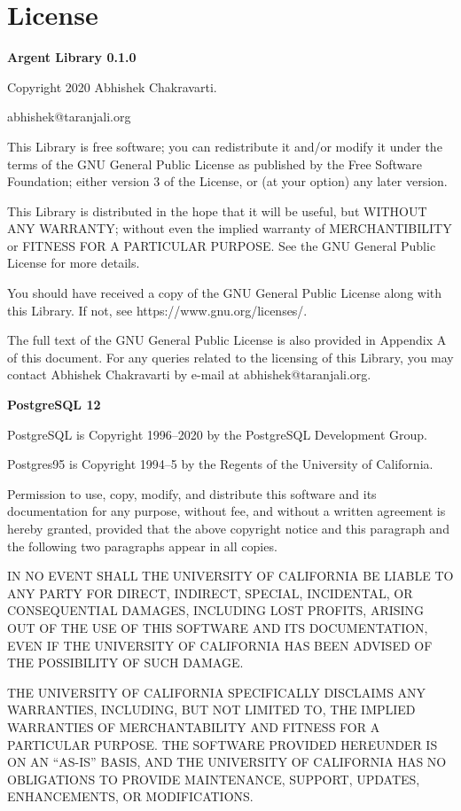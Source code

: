 \chapter{License}

\begin{center}
\textbf{Argent Library 0.1.0} \par
Copyright \small{\textcopyright} 2020 Abhishek Chakravarti.\par
abhishek@taranjali.org
\end{center}

This Library is free software; you can redistribute it and/or modify it under 
the terms of the GNU General Public License as published by the Free Software 
Foundation; either version 3 of the License, or (at your option) any later 
version.

This Library is distributed in the hope that it will be useful, but WITHOUT ANY 
WARRANTY; without even the implied warranty of MERCHANTIBILITY or FITNESS FOR A 
PARTICULAR PURPOSE. See the GNU General Public License for more details.

You should have received a copy of the GNU General Public License along with 
this Library. If not, see https://www.gnu.org/licenses/. 

The full text of the GNU General Public License is also provided in Appendix A 
of this document. For any queries related to the licensing of this Library, you 
may contact Abhishek Chakravarti by e-mail at abhishek@taranjali.org.


\begin{center}
\textbf{PostgreSQL 12} \par
PostgreSQL is Copyright \small{\textcopyright} 1996--2020 by the PostgreSQL 
Development Group.\par
Postgres95 is Copyright \small{\textcopyright} 1994--5 by the Regents of the 
University of California.
\end{center}

Permission to use, copy, modify, and distribute this software and its 
documentation for any purpose, without fee, and without a written agreement is 
hereby granted, provided that the above copyright notice and this paragraph and 
the following two paragraphs appear in all copies.

IN NO EVENT SHALL THE UNIVERSITY OF CALIFORNIA BE LIABLE TO ANY PARTY FOR 
DIRECT, INDIRECT, SPECIAL, INCIDENTAL, OR CONSEQUENTIAL DAMAGES, INCLUDING LOST 
PROFITS, ARISING OUT OF THE USE OF THIS SOFTWARE AND ITS DOCUMENTATION, EVEN IF 
THE UNIVERSITY OF CALIFORNIA HAS BEEN ADVISED OF THE POSSIBILITY OF SUCH DAMAGE.

THE UNIVERSITY OF CALIFORNIA SPECIFICALLY DISCLAIMS ANY WARRANTIES, INCLUDING, 
BUT NOT LIMITED TO, THE IMPLIED WARRANTIES OF MERCHANTABILITY AND FITNESS FOR A 
PARTICULAR PURPOSE. THE SOFTWARE PROVIDED HEREUNDER IS ON AN “AS-IS” BASIS, AND 
THE UNIVERSITY OF CALIFORNIA HAS NO OBLIGATIONS TO PROVIDE MAINTENANCE, SUPPORT, 
UPDATES, ENHANCEMENTS, OR MODIFICATIONS.

